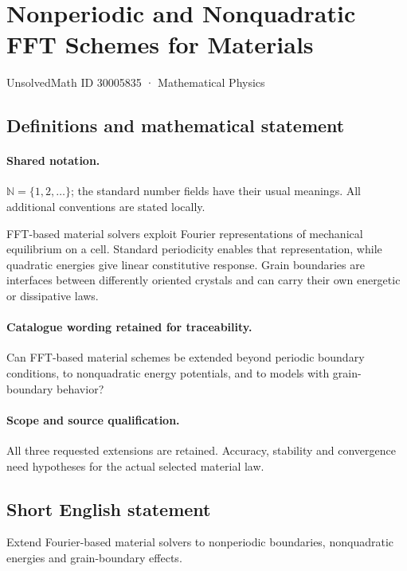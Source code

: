 \documentclass[11pt]{article}
\begin{document}
\setcounter{section}{30005834}
\section{Nonperiodic and Nonquadratic FFT Schemes for Materials}\label{30005835}
{\small UnsolvedMath ID 30005835 · Mathematical Physics}
\subsection{Definitions and mathematical statement}

\paragraph{Shared notation.}$\mathbb N=\{1,2,\ldots\}$; the standard number fields have their usual meanings. All additional conventions are stated locally.


FFT-based material solvers exploit Fourier representations of mechanical equilibrium on a cell. Standard periodicity enables that representation, while quadratic energies give linear constitutive response. Grain boundaries are interfaces between differently oriented crystals and can carry their own energetic or dissipative laws.

\paragraph{Catalogue wording retained for traceability.}
Can FFT-based material schemes be extended beyond periodic boundary conditions, to nonquadratic energy potentials, and to models with grain-boundary behavior?

\paragraph{Scope and source qualification.}All three requested extensions are retained. Accuracy, stability and convergence need hypotheses for the actual selected material law.
\subsection{Short English statement}
Extend Fourier-based material solvers to nonperiodic boundaries, nonquadratic energies and grain-boundary effects.
\end{document}

